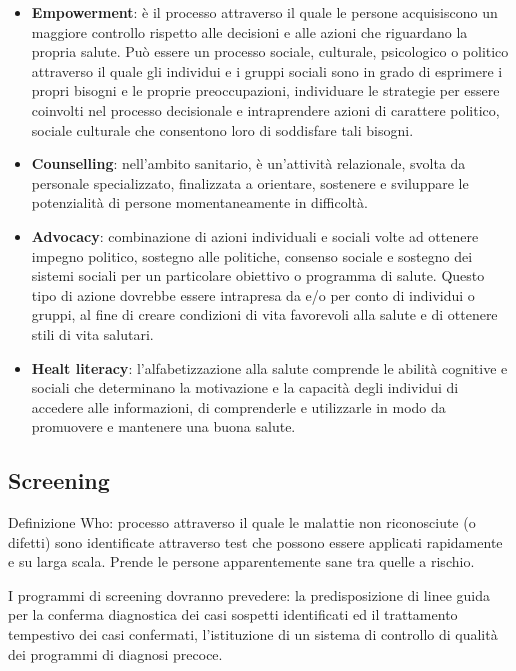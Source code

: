 \begin{itemize}
\item
  \textbf{Empowerment}: è il processo attraverso il quale le persone
  acquisiscono un maggiore controllo rispetto alle decisioni e alle
  azioni che riguardano la propria salute. Può essere un processo
  sociale, culturale, psicologico o politico attraverso il quale gli
  individui e i gruppi sociali sono in grado di esprimere i propri
  bisogni e le proprie preoccupazioni, individuare le strategie per
  essere coinvolti nel processo decisionale e intraprendere azioni di
  carattere politico, sociale culturale che consentono loro di
  soddisfare tali bisogni.
\item
  \textbf{Counselling}: nell'ambito sanitario, è un'attività
  relazionale, svolta da personale specializzato, finalizzata a
  orientare, sostenere e sviluppare le potenzialità di persone
  momentaneamente in difficoltà.
\item
  \textbf{Advocacy}: combinazione di azioni individuali e sociali volte
  ad ottenere impegno politico, sostegno alle politiche, consenso
  sociale e sostegno dei sistemi sociali per un particolare obiettivo o
  programma di salute. Questo tipo di azione dovrebbe essere intrapresa
  da e/o per conto di individui o gruppi, al fine di creare condizioni
  di vita favorevoli alla salute e di ottenere stili di vita salutari.
\item
  \textbf{Healt literacy}: l'alfabetizzazione alla salute comprende le
  abilità cognitive e sociali che determinano la motivazione e la
  capacità degli individui di accedere alle informazioni, di
  comprenderle e utilizzarle in modo da promuovere e mantenere una buona
  salute.
\end{itemize}

\subsection{Screening}

Definizione Who: processo attraverso il quale le malattie non
riconosciute (o difetti) sono identificate attraverso test che possono
essere applicati rapidamente e su larga scala. Prende le persone
apparentemente sane tra quelle a rischio.

I programmi di screening dovranno prevedere: la predisposizione di linee
guida per la conferma diagnostica dei casi sospetti identificati ed il
trattamento tempestivo dei casi confermati, l'istituzione di un sistema
di controllo di qualità dei programmi di diagnosi precoce.

